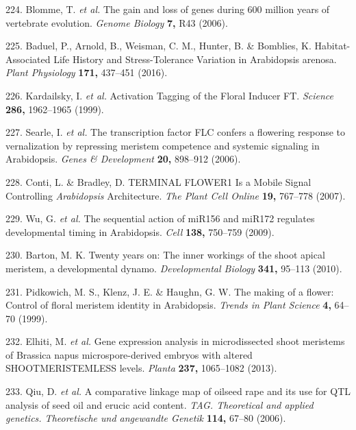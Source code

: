 \documentclass[12pt,]{book}
\begin{document}
\hypertarget{ref-blomme_gain_2006}{}
224. Blomme, T. \emph{et al.} The gain and loss of genes during 600
million years of vertebrate evolution. \emph{Genome Biology} \textbf{7,}
R43 (2006).

\hypertarget{ref-baduel_habitat_associated_2016}{}
225. Baduel, P., Arnold, B., Weisman, C. M., Hunter, B. \& Bomblies, K.
Habitat-Associated Life History and Stress-Tolerance Variation in
Arabidopsis arenosa. \emph{Plant Physiology} \textbf{171,} 437--451
(2016).

\hypertarget{ref-kardailsky_activation_1999}{}
226. Kardailsky, I. \emph{et al.} Activation Tagging of the Floral
Inducer FT. \emph{Science} \textbf{286,} 1962--1965 (1999).

\hypertarget{ref-searle_transcription_2006}{}
227. Searle, I. \emph{et al.} The transcription factor FLC confers a
flowering response to vernalization by repressing meristem competence
and systemic signaling in Arabidopsis. \emph{Genes \& Development}
\textbf{20,} 898--912 (2006).

\hypertarget{ref-conti_terminal_2007}{}
228. Conti, L. \& Bradley, D. TERMINAL FLOWER1 Is a Mobile Signal
Controlling \emph{Arabidopsis} Architecture. \emph{The Plant Cell
Online} \textbf{19,} 767--778 (2007).

\hypertarget{ref-wu_sequential_2009}{}
229. Wu, G. \emph{et al.} The sequential action of miR156 and miR172
regulates developmental timing in Arabidopsis. \emph{Cell} \textbf{138,}
750--759 (2009).

\hypertarget{ref-barton_twenty_2010}{}
230. Barton, M. K. Twenty years on: The inner workings of the shoot
apical meristem, a developmental dynamo. \emph{Developmental Biology}
\textbf{341,} 95--113 (2010).

\hypertarget{ref-pidkowich_making_1999}{}
231. Pidkowich, M. S., Klenz, J. E. \& Haughn, G. W. The making of a
flower: Control of floral meristem identity in Arabidopsis. \emph{Trends
in Plant Science} \textbf{4,} 64--70 (1999).

\hypertarget{ref-elhiti_gene_2013}{}
232. Elhiti, M. \emph{et al.} Gene expression analysis in microdissected
shoot meristems of Brassica napus microspore-derived embryos with
altered SHOOTMERISTEMLESS levels. \emph{Planta} \textbf{237,} 1065--1082
(2013).

\hypertarget{ref-qiu_comparative_2006}{}
233. Qiu, D. \emph{et al.} A comparative linkage map of oilseed rape and
its use for QTL analysis of seed oil and erucic acid content. \emph{TAG.
Theoretical and applied genetics. Theoretische und angewandte Genetik}
\textbf{114,} 67--80 (2006).
\end{document}
